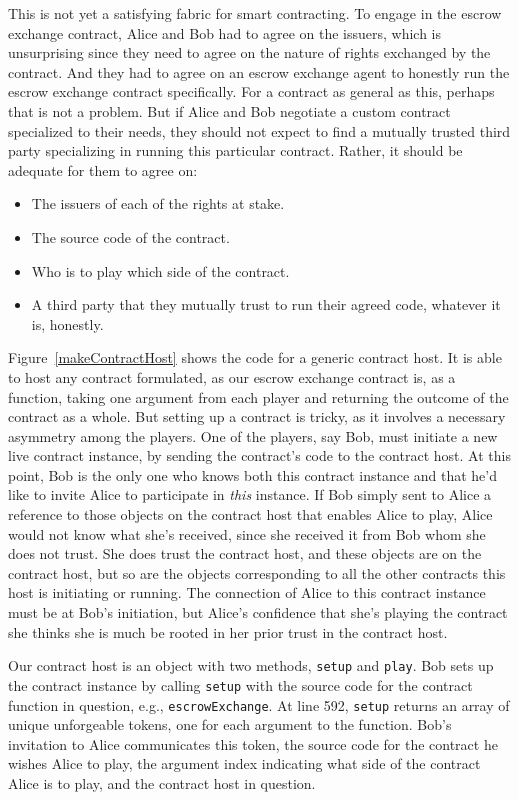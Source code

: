 \documentclass{llncs}
\begin{document}
This is not yet a satisfying fabric for smart contracting. To engage in the escrow exchange contract, Alice and Bob had to agree on the issuers, which is unsurprising since they need to agree on the nature of rights exchanged by the contract. And they had to agree on an escrow exchange agent to honestly run the escrow exchange contract specifically. For a contract as general as this, perhaps that is not a problem. But if Alice and Bob negotiate a custom contract specialized to their needs, they should not expect to find a mutually trusted third party specializing in running this particular contract. Rather, it should be adequate for them to agree on:

\begin{itemize}
\item The issuers of each of the rights at stake.
\item The source code of the contract.
\item Who is to play which side of the contract.
\item A third party that they mutually trust to run their agreed code, whatever it is, honestly.
\end{itemize}

Figure~\ref{makeContractHost} shows the code for a generic contract host. It is able to host any contract formulated, as our escrow exchange contract is, as a function, taking one argument from each player and returning the outcome of the contract as a whole. But setting up a contract is tricky, as it involves a necessary asymmetry among the players. One of the players, say Bob, must initiate a new live contract instance, by sending the contract's code to the contract host. At this point, Bob is the only one who knows both this contract instance and that he'd like to invite Alice to participate in \emph{this} instance. If Bob simply sent to Alice a reference to those objects on the contract host that enables Alice to play, Alice would not know what she's received, since she received it from Bob whom she does not trust. She does trust the contract host, and these objects are on the contract host, but so are the objects corresponding to all the other contracts this host is initiating or running. The connection of Alice to this contract instance must be at Bob's initiation, but Alice's confidence that she's playing the contract she thinks she is much be rooted in her prior trust in the contract host.

Our contract host is an object with two methods, {\tt setup} and {\tt play}. Bob sets up the contract instance by calling {\tt setup} with the source code for the contract function in question, e.g., {\tt escrowExchange}. At line 592, {\tt setup} returns an array of unique unforgeable tokens, one for each argument to the function. Bob's invitation to Alice communicates this token, the source code for the contract he wishes Alice to play, the argument index indicating what side of the contract Alice is to play, and the contract host in question.
\end{document}
